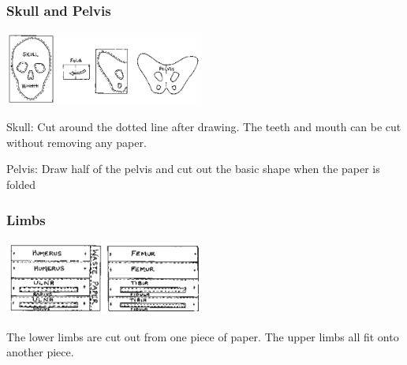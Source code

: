 \begin{multicols}{2}
\subsubsection{Skull and Pelvis}

\begin{center}
\includegraphics[width=0.49\textwidth]{./img/source/skeleton-skull-pelvis.png}
\end{center}

\begin{description*}
\item[Skull:]{Cut around the dotted line after
drawing. The teeth and mouth
can be cut without removing any
paper.}
\item[Pelvis:]{Draw half of the pelvis and cut out the basic shape when the paper is
folded}
\end{description*}

\subsubsection{Limbs}

\begin{center}
\includegraphics[width=0.49\textwidth]{./img/source/skeleton-limbs.png}
\end{center}
The lower limbs are cut out from one piece of paper. The upper limbs
all fit onto another piece.


\end{multicols}
